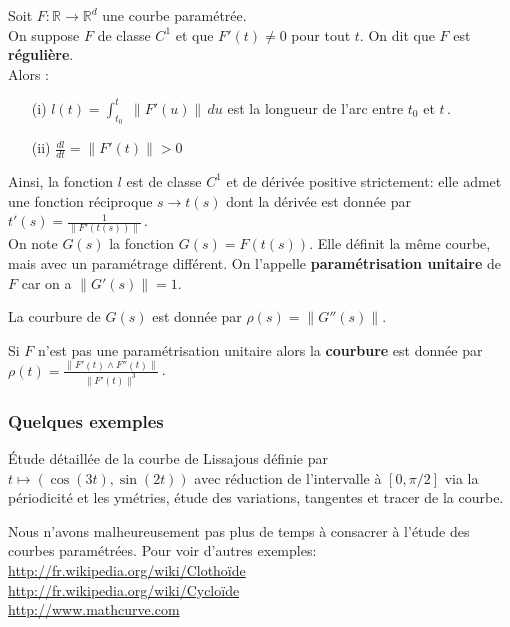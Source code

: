 \documentclass[class=report,crop=false]{standalone}
\begin{document}
\vskip 5mm




Soit $F : \mathbb{R} \rightarrow \mathbb{R}^d$ une courbe paramétrée. \\
On suppose $F$ de classe $C^1$ et que $F'(t) \neq 0$ pour tout $t$.
On dit que $F$ est {\bf réguli\`ere}. \\
Alors :
\begin{enumerate}
\item[(i)] $l(t) = \displaystyle \int_{t_{0}}^t\; \|F' (u)\|\, du$ est la longueur de l'arc entre $t_{0}$ et $t$\,.
\item[(ii)] $\displaystyle \frac{dl}{dt} = \|F'(t)\| > 0$
\end{enumerate}



Ainsi, la fonction $l$ est de classe $C^1$ et de dérivée positive strictement: elle admet une fonction réciproque $s \rightarrow t(s)$ dont la dérivée est donnée par $t'(s) = \displaystyle \frac{1}{\|F'(t(s))\|}$\,.\\
On note $G(s)$ la fonction $G(s) = F(t(s))$. Elle définit la m\^eme courbe, mais avec un paramétrage différent. On l'appelle {\bf paramétrisation unitaire} de $F$ car on a $\|G'(s)\| = 1$.


\begin{definition}
La courbure de $G (s)$ est donnée par $\rho(s) = \|G''(s)\|$.
\end{definition}

\begin{proposition} Si $F$ n'est pas une paramétrisation unitaire alors la {\bf courbure} est donnée par $\displaystyle \rho(t) = \frac{\|F'(t) \land F''(t)\|}{\|F'(t)\|^3}$\,.
\end{proposition}





\subsubsection{Quelques exemples}
\'Etude détaillée de la courbe de Lissajous définie par $t\mapsto (\cos (3t),\sin (2t))$ avec réduction de l'intervalle \`a $[0,\pi/2]$ via la périodicité et les ymétries, étude des variations, tangentes et tracer de la courbe.









Nous n'avons malheureusement pas plus de temps \`a consacrer \`a l'étude des courbes paramétrées. Pour voir d'autres exemples:\\
\url{http://fr.wikipedia.org/wiki/Clothoïde}\\
\url{http://fr.wikipedia.org/wiki/Cycloïde}\\
\url{http://www.mathcurve.com}
\end{document}
